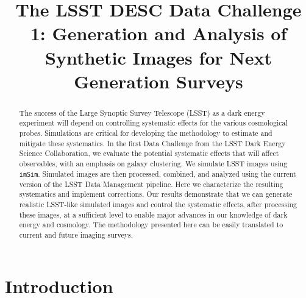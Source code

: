 \documentclass[\docopts]{\docclass}
\begin{document}
\title[LSST DESC DC1]{The LSST DESC Data Challenge 1: Generation and Analysis of Synthetic Images for Next Generation Surveys }

\maketitlepre

\begin{abstract}

The success of the Large Synoptic Survey Telescope (LSST) as a dark energy experiment will depend on controlling systematic effects for the various cosmological probes.  Simulations are critical for developing the methodology to estimate and mitigate these systematics.  In the first Data Challenge from the LSST Dark Energy Science Collaboration, we evaluate the potential systematic effects that will affect observables, with an emphasis on galaxy clustering.  We simulate LSST images using \texttt{imSim}. Simulated images are then processed, combined, and analyzed using the current version of the LSST Data Management pipeline.  Here we characterize the resulting systematics and implement corrections.  Our results demonstrate that we can generate realistic LSST-like simulated images and control the systematic effects, after processing these images, at a sufficient level to enable major advances in our knowledge of dark energy and cosmology. The methodology presented here can be easily translated to current and future imaging surveys.
\end{abstract}


\maketitlepost

%

\section{Introduction}
\label{sec:intro}
\end{document}
